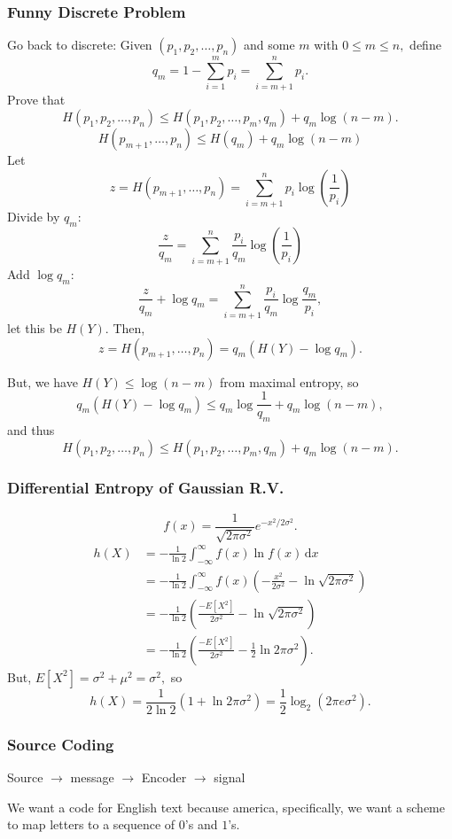 \documentclass[12pt]{article}
\newcommand{\diffn}[1]{\,\mathrm{d}{#1}}
\newcommand{\parens}[1]{\left({#1}\right)}
\begin{document}
\subsubsection{Funny Discrete Problem}
Go back to discrete:
Given $(p_1,p_2,\dots,p_n)$ and some $m$ with $0\le m\le n,$
define
\[q_m=1-\sum_{i=1}^mp_i = \sum_{i=m+1}^n p_i.\]
Prove that
\[H(p_1,p_2,\dots,p_n)\le H(p_1,p_2,\dots,p_m,q_m)+q_m\log(n-m).\]
\[H(p_{m+1},\dots,p_n) \le H(q_m)+ q_m \log(n-m)\]
Let
\[z=H(p_{m+1},\dots,p_n)=\sum_{i=m+1}^n p_i \log\parens{\frac{1}{p_i}}\]
Divide by $q_m:$
\[\frac{z}{q_m}=\sum_{i=m+1}^n \frac{p_i}{q_m} \log\parens{\frac{1}{p_i}}\]
Add $\log q_m:$
\[\frac{z}{q_m}+\log q_m=\sum_{i=m+1}^n\frac{p_{i}}{q_m}\log\frac{q_m}{p_{i}},\]
let this be $H(Y).$
Then,
\[z=H(p_{m+1},\dots,p_n)=q_m(H(Y)-\log q_m).\]

But, we have $H(Y)\le \log(n-m)$ from maximal entropy,
so
\[q_m(H(Y)-\log q_m)\le q_m\log\frac{1}{q_m}+q_m\log(n-m),\]
and thus
\[H(p_1,p_2,\dots,p_n)\le H(p_1,p_2,\dots,p_m,q_m)+q_m\log(n-m).\]


\subsubsection{Differential Entropy of Gaussian R.V.}
\[f(x)=\frac{1}{\sqrt{2\pi\sigma^2}}e^{-x^2/{2\sigma^2}}.\]
\begin{align*}
h(X)&=-\frac{1}{\ln 2}\int_{-\infty}^\infty f(x)\ln f(x)\diffn{x}\\
&=-\frac{1}{\ln 2}\int_{-\infty}^\infty f(x)\left(-\frac{x^2}{2\sigma^2}-\ln\sqrt{2\pi\sigma^2}\right)
\\&=-\frac{1}{\ln 2} \left( \frac{-E[X^2]}{2\sigma^2}-\ln\sqrt{2\pi\sigma^2} \right)\\
&=-\frac{1}{\ln 2} \left( \frac{-E[X^2]}{2\sigma^2}-\frac{1}{2}\ln2\pi\sigma^2 \right).
\end{align*}
But, $E[X^2]=\sigma^2+\mu^2=\sigma^2,$
so
\[h(X)=\frac{1}{2 \ln 2}\parens{1+\ln 2\pi\sigma^2}=\frac{1}{2}\log_2(2\pi e\sigma^2).\]

\subsubsection{Source Coding}


Source $\to$ message $\to$ Encoder $\to$ signal

We want a code for English text because america, specifically, we want a scheme to map letters to a sequence of $0$'s and $1$'s.
\end{document}

